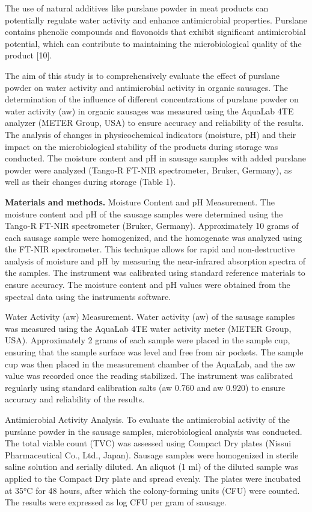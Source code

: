 The use of natural additives like purslane powder in meat products can
potentially regulate water activity and enhance antimicrobial
properties. Purslane contains phenolic compounds and flavonoids that
exhibit significant antimicrobial potential, which can contribute to
maintaining the microbiological quality of the product {[}10{]}.

The aim of this study is to comprehensively evaluate the effect of
purslane powder on water activity and antimicrobial activity in organic
sausages. The determination of the influence of different concentrations
of purslane powder on water activity (aw) in organic sausages was
measured using the AquaLab 4TE analyzer (METER Group, USA) to ensure
accuracy and reliability of the results. The analysis of changes in
physicochemical indicators (moisture, pH) and their impact on the
microbiological stability of the products during storage was conducted.
The moisture content and pH in sausage samples with added purslane
powder were analyzed (Tango-R FT-NIR spectrometer, Bruker, Germany), as
well as their changes during storage (Table 1).

{\bfseries Materials and methods.} Moisture Content and pH Measurement. The
moisture content and pH of the sausage samples were determined using the
Tango-R FT-NIR spectrometer (Bruker, Germany). Approximately 10 grams of
each sausage sample were homogenized, and the homogenate was analyzed
using the FT-NIR spectrometer. This technique allows for rapid and
non-destructive analysis of moisture and pH by measuring the
near-infrared absorption spectra of the samples. The instrument was
calibrated using standard reference materials to ensure accuracy. The
moisture content and pH values were obtained from the spectral data
using the instrument\textquotesingle s software.

Water Activity (aw) Measurement. Water activity (aw) of the sausage
samples was measured using the AquaLab 4TE water activity meter (METER
Group, USA). Approximately 2 grams of each sample were placed in the
sample cup, ensuring that the sample surface was level and free from air
pockets. The sample cup was then placed in the measurement chamber of
the AquaLab, and the aw value was recorded once the reading stabilized.
The instrument was calibrated regularly using standard calibration salts
(aw 0.760 and aw 0.920) to ensure accuracy and reliability of the
results.

Antimicrobial Activity Analysis. To evaluate the antimicrobial activity
of the purslane powder in the sausage samples, microbiological analysis
was conducted. The total viable count (TVC) was assessed using Compact
Dry plates (Nissui Pharmaceutical Co., Ltd., Japan). Sausage samples
were homogenized in sterile saline solution and serially diluted. An
aliquot (1 ml) of the diluted sample was applied to the Compact Dry
plate and spread evenly. The plates were incubated at 35°C for 48 hours,
after which the colony-forming units (CFU) were counted. The results
were expressed as log CFU per gram of sausage.

